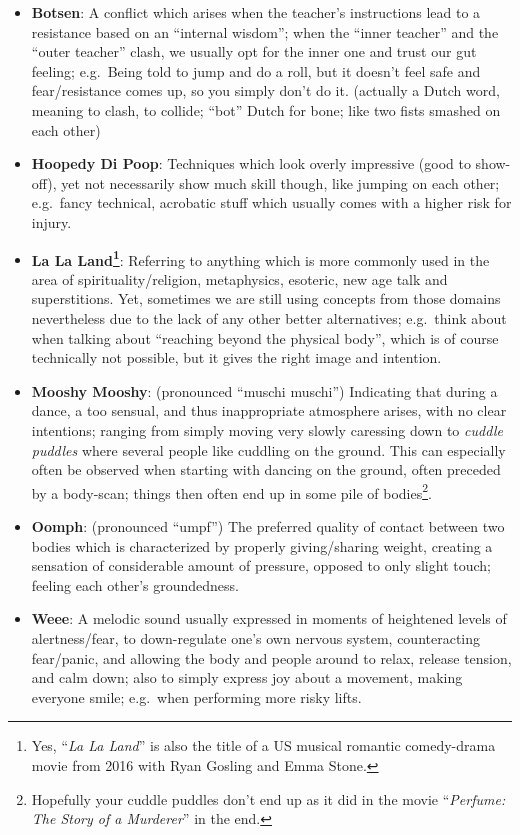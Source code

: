\begin{itemize}
    \item \textbf{Botsen}: A conflict which arises when the teacher's instructions lead to a resistance based on an ``internal wisdom''; when the ``inner teacher'' and the ``outer teacher'' clash, we usually opt for the inner one and trust our gut feeling; e.g.\ Being told to jump and do a roll, but it doesn't feel safe and fear/resistance comes up, so you simply don't do it.
    (actually a Dutch word, meaning to clash, to collide; ``bot'' Dutch for bone; like two fists smashed on each other)
    \item \textbf{Hoopedy Di Poop}: Techniques which look overly impressive (good to show-off), yet not necessarily show much skill though, like jumping on each other; e.g.\ fancy technical, acrobatic stuff which usually comes with a higher risk for injury.
    \item \textbf{La La Land\footnote{Yes, ``\textit{La La Land}'' is also the title of a US musical romantic comedy-drama movie from 2016 with Ryan Gosling and Emma Stone.}}: Referring to anything which is more commonly used in the area of spirituality/religion, metaphysics, esoteric, new age talk and superstitions.
    Yet, sometimes we are still using concepts from those domains nevertheless due to the lack of any other better alternatives; e.g.\ think about when talking about ``reaching beyond the physical body'', which is of course technically not possible, but it gives the right image and intention.
    \item \textbf{Mooshy Mooshy}: (pronounced ``muschi muschi'') Indicating that during a dance, a too sensual, and thus inappropriate atmosphere arises, with no clear intentions; ranging from simply moving very slowly caressing down to \textit{cuddle puddles} where several people like cuddling on the ground.
    This can especially often be observed when starting with dancing on the ground, often preceded by a body-scan; things then often end up in some pile of bodies\footnote{Hopefully your cuddle puddles don't end up as it did in the movie ``\textit{Perfume: The Story of a Murderer}'' in the end.}.
    \item \textbf{Oomph}: (pronounced ``umpf'') The preferred quality of contact between two bodies which is characterized by properly giving/sharing weight, creating a sensation of considerable amount of pressure, opposed to only slight touch; feeling each other's groundedness.
    \item \textbf{Weee}: A melodic sound usually expressed in moments of heightened levels of alertness/fear, to down-regulate one's own nervous system, counteracting fear/panic, and allowing the body and people around to relax, release tension, and calm down; also to simply express joy about a movement, making everyone smile; e.g.\ when performing more risky lifts.
\end{itemize}

